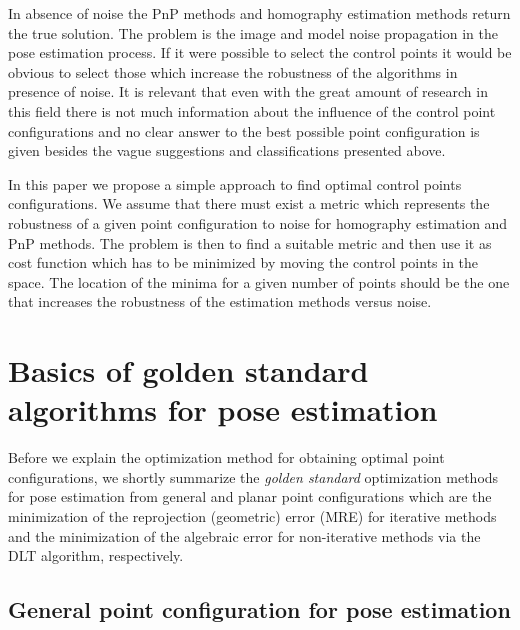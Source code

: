 \documentclass[letterpaper, 10 pt, conference]{ieeeconf}  %
\begin{document}
	
	
	In absence of noise the PnP methods and homography estimation methods return the true solution. The problem is the image and model noise propagation in the pose estimation process. If it were possible to select the control points it would be obvious to select those which increase the robustness of the algorithms in presence of noise. It is relevant that even with the great amount of research in this field there is not much information about the influence of the control point configurations and no clear answer to the best possible point configuration is given besides the vague suggestions and classifications presented above. 
	
	In this paper we propose a simple approach to find optimal control points configurations. We assume that there must exist a metric which represents the robustness of a given point configuration to noise for homography estimation and PnP methods. The problem is then to find a suitable metric and then use it as cost function which has to be minimized by moving the control points in the space. The location of the minima for a given number of points should be the one that increases the robustness of the estimation methods versus noise.
	
	
	\section{Basics of golden standard algorithms for pose estimation}
	\label{SecBasics}
	
	Before we explain the optimization method for obtaining optimal point configurations, we shortly summarize the \textit{golden standard} optimization methods for
	pose estimation from general and planar point configurations which are the minimization of the reprojection (geometric) error (MRE) for iterative methods and the minimization of the algebraic error for non-iterative methods via the DLT algorithm, respectively. 
	
	\subsection{General point configuration for pose estimation}
	
\end{document}
